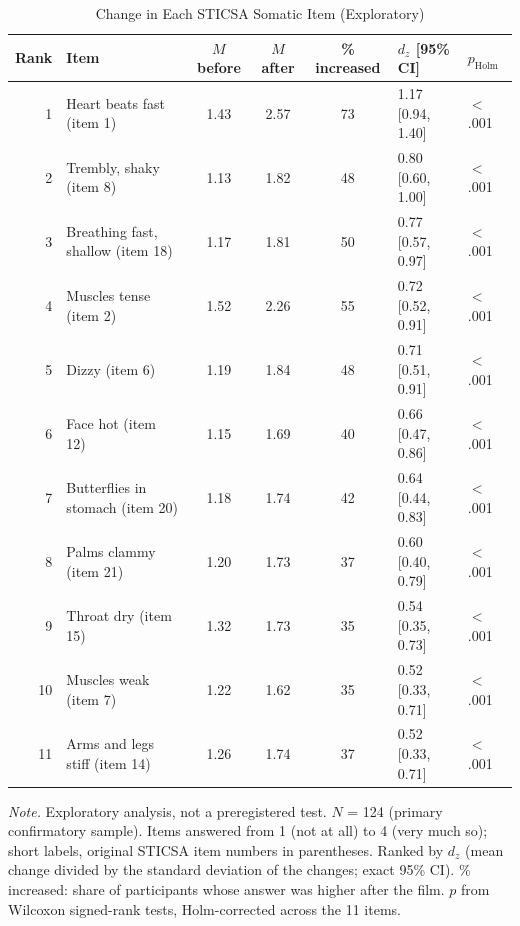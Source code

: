 \begin{table}[tbp]
\caption{Change in Each STICSA Somatic Item (Exploratory)}
\label{tab:items}
\begin{threeparttable}
\small\linespread{1}\selectfont
\begin{tabular}{@{}rlcccll@{}}
\toprule
Rank & Item & $M$ before & $M$ after & \% increased & $d_z$ [95\% CI] & $p_\mathrm{Holm}$ \\
\midrule
1 & Heart beats fast (item 1) & 1.43 & 2.57 & 73 & 1.17 [0.94, 1.40] & $<$ .001 \\
2 & Trembly, shaky (item 8) & 1.13 & 1.82 & 48 & 0.80 [0.60, 1.00] & $<$ .001 \\
3 & Breathing fast, shallow (item 18) & 1.17 & 1.81 & 50 & 0.77 [0.57, 0.97] & $<$ .001 \\
4 & Muscles tense (item 2) & 1.52 & 2.26 & 55 & 0.72 [0.52, 0.91] & $<$ .001 \\
5 & Dizzy (item 6) & 1.19 & 1.84 & 48 & 0.71 [0.51, 0.91] & $<$ .001 \\
6 & Face hot (item 12) & 1.15 & 1.69 & 40 & 0.66 [0.47, 0.86] & $<$ .001 \\
7 & Butterflies in stomach (item 20) & 1.18 & 1.74 & 42 & 0.64 [0.44, 0.83] & $<$ .001 \\
8 & Palms clammy (item 21) & 1.20 & 1.73 & 37 & 0.60 [0.40, 0.79] & $<$ .001 \\
9 & Throat dry (item 15) & 1.32 & 1.73 & 35 & 0.54 [0.35, 0.73] & $<$ .001 \\
10 & Muscles weak (item 7) & 1.22 & 1.62 & 35 & 0.52 [0.33, 0.71] & $<$ .001 \\
11 & Arms and legs stiff (item 14) & 1.26 & 1.74 & 37 & 0.52 [0.33, 0.71] & $<$ .001 \\
\bottomrule
\end{tabular}
\vspace{4pt}
\begin{tablenotes}
{\small\textit{Note.} Exploratory analysis, not a preregistered test. $N$ = 124 (primary confirmatory sample). Items answered from 1 (not at all) to 4 (very much so); short labels, original STICSA item numbers in parentheses. Ranked by $d_z$ (mean change divided by the standard deviation of the changes; exact 95\% CI). \% increased: share of participants whose answer was higher after the film. $p$ from Wilcoxon signed-rank tests, Holm-corrected across the 11 items.}
\end{tablenotes}
\end{threeparttable}
\end{table}
